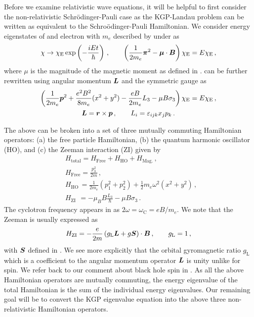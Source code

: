Before we examine relativistic wave equations, it will be helpful to first consider the non-relativistic Schr{\"o}dinger-Pauli case as the KGP-Landau problem can be written as equivalent to the Schro{\"o}dinger-Pauli Hamiltonian. We consider energy eigenstates of and electron with $m_{e}$ described by  under  as
\begin{alignat}{1}
	\label{homogeneous:3} \chi\rightarrow\chi_\mathrm{E}\exp\left(-\frac{iEt}{\hbar}\right)\,,\qquad\left(\frac{1}{2m_{e}}\boldsymbol{\pi}^{2}-\boldsymbol{\mu}\cdot\boldsymbol{B}\right)\chi_\mathrm{E}=E\chi_\mathrm{E}\,,
\end{alignat}
where $\mu$ is the magnitude of the magnetic moment as defined in .  can be further rewritten using angular momentum $\boldsymbol{L}$ and the symmetric gauge  as
\begin{gather}
	\label{homogeneous:4} \left(\frac{1}{2m_{e}}\boldsymbol{p}^{2}+\frac{e^{2}B^{2}}{8m_{e}}(x^{2}+y^{2})-\frac{eB}{2m_{e}}L_{3}-\mu B\sigma_{3}\right)\chi_\mathrm{E}=E\chi_\mathrm{E}\,,\\
    \boldsymbol{L}=\boldsymbol{r}\times\boldsymbol{p}\,,\qquad L_{i}=\varepsilon_{ijk}x_{j}p_{k}\,.
\end{gather}

The above can be broken into a set of three mutually commuting Hamiltonian operators: (a) the free particle Hamiltonian, (b) the quantum harmonic oscillator (HO), and (c) the Zeeman interaction (ZI) given by
\begin{align}
	\label{homogeneous:7}
    &H_\mathrm{total}=H_\mathrm{Free}+H_\mathrm{HO}+H_\mathrm{Mag.}\,,\\
	\label{homogeneous:7a}
    &H_{\mathrm{Free}}=\frac{p_{3}^{2}}{2m}\,,\\
	\label{homogeneous:7b}
    &H_\mathrm{HO}\,=\frac{1}{2m_{e}}\left(p_{1}^{2}+p_{2}^{2}\right) + \frac{1}{2}m_{e}\omega^{2}(x^{2}+y^{2})\,,\\
	\label{homogeneous:7c}
    &H_{\mathrm{ZI}}\ \,=-\mu_{B}B\frac{L_{3}}{\hbar}-\mu B\sigma_{3}\,.
\end{align}
The cyclotron frequency appears in  as $2\omega=\omega_\mathrm{C}=eB/m_{e}$. We note that the Zeeman  is usually expressed as
\begin{alignat}{1}
	\label{homogeneous:7d}
    H_{\mathrm{ZI}}=-\frac{e}{2m}\left(g_\mathrm{L}\boldsymbol{L}+g\boldsymbol{S}\right)\cdot\boldsymbol{B}\,,\qquad g_\mathrm{L}=1\,,
\end{alignat}
with $\boldsymbol{S}$ defined in . We see more explicitly that the orbital gyromagnetic ratio $g_\mathrm{L}$ which is a coefficient to the angular momentum operator $\boldsymbol{L}$ is unity unlike for spin. We refer back to our comment about black hole spin in . As all the above Hamiltonian operators are mutually commuting, the energy eigenvalue of the total Hamiltonian is the sum of the individual energy eigenvalues. Our remaining goal will be to convert the KGP eigenvalue equation into the above three non-relativistic Hamiltonian operators. 

